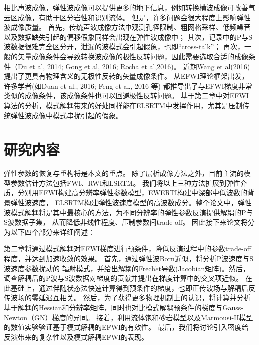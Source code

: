 相比声波成像，弹性波成像可以提供更多的地下信息，例如转换横波成像可改善气云区成像，有助于区分岩性和识别流体。
但是，许多问题会很大程度上影响弹性波成像质量。
首先，传统声波成像方法中观测孔径限制、粗网格采样、低频噪音以及数据缺失引起的偏移假象同样会出现在弹性波成像中；
其次，记录中的P与S波数据很难完全区分开，泄漏的波模式会引起假象，也即“cross-talk”；
再次，一般的矢量成像条件会导致转换波成像的极性反转问题，因此需要选取合适的成像条件（Du et al,
2014\cite{DuEtAl2014}; Gong et al, 2016\cite{GongEtAl2016}; Rocha et al,2016\cite{RochaEtAl2016a})。
近期Wang et al(2016)\cite{WangChenlongEtAl2016}提出了更具有物理含义的无极性反转的矢量成像条件。
从EFWI理论框架出发，许多学者(如Duan et al., 2016\cite{Duan2016}; Feng et al., 2016\cite{Feng2016} 等)
都推导出了与EFWI梯度非常类似的成像条件，该成像条件也可以回避极性反转问题。
基于第二章中对EFWI算法的分析，模式解耦带来的好处同样能在ELSRTM中发挥作用，尤其是压制传统弹性波成像中模式串扰引起的假象。


\section{研究内容}
弹性参数的恢复与重构将是本文的重点。
除了层析成像方法之外，目前主流的模型参数估计方法包括FWI、RWI和LSRTM。
我们将以上三种方法扩展到弹性介质，分别用EFWI构建高分辨率弹性参数模型，EWERTI构建中深部中低波数的背景弹性波速度，
ELSRTM构建弹性波速度模型的高波数成分。整个论文中，弹性波模式解耦将是其中最核心的方法，为不同分辨率的弹性参数反演提供解耦的P与S波数据子集，
从而降低非线性程度、压制参数间trade-off。
因此接下来论文将分为以下四个部分来详细阐述：

第二章将通过模式解耦对EFWI梯度进行预条件，降低反演过程中的参数trade-off程度，并达到加速收敛的效果。
首先，通过弹性波Born近似，将分析P波速度与S波速度参数扰动的
辐射模式，并给出解耦的Frech{$\acute{e}$}t导数(Jacobian矩阵)。然后，调查解耦后的P波与S波数据对梯度的贡献并提出在梯度计算中的交叉项近似。
在此基础上，通过伴随状态法快速计算得到预条件的梯度\cite[]{plessix2006}，也即正传波场与解耦后反传波场的零延迟互相关。
然后，为了获得更多物理机制上的认识，将计算并分析基于解耦的Hessian和分辨率矩阵，同时也对比模式解耦预条件的梯度与Gauss-Newton（GN）梯度的异同。
接着，利用流体饱和砂岩模型以及Marmousi-II模型的数值实验验证基于模式解耦的EFWI的有效性。
最后，我们将讨论引入密度给反演带来的复杂性以及模式解耦EFWI的表现。


